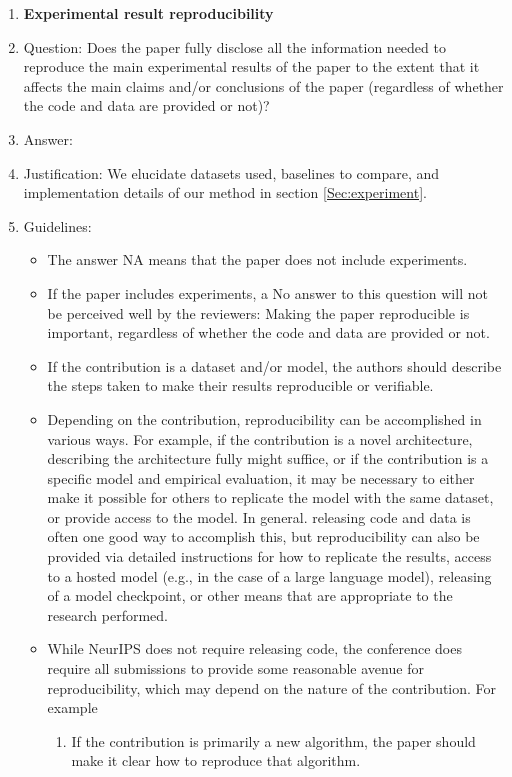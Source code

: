 \documentclass{article}
\begin{document}
\begin{enumerate}
    \item {\bf Experimental result reproducibility}
    \item[] Question: Does the paper fully disclose all the information needed to reproduce the main experimental results of the paper to the extent that it affects the main claims and/or conclusions of the paper (regardless of whether the code and data are provided or not)?
    \item[] Answer: \answerYes{} %
    \item[] Justification: We elucidate datasets used, baselines to compare, and implementation details of our method in section \ref{Sec:experiment}.
    \item[] Guidelines:
    \begin{itemize}
        \item The answer NA means that the paper does not include experiments.
        \item If the paper includes experiments, a No answer to this question will not be perceived well by the reviewers: Making the paper reproducible is important, regardless of whether the code and data are provided or not.
        \item If the contribution is a dataset and/or model, the authors should describe the steps taken to make their results reproducible or verifiable. 
        \item Depending on the contribution, reproducibility can be accomplished in various ways. For example, if the contribution is a novel architecture, describing the architecture fully might suffice, or if the contribution is a specific model and empirical evaluation, it may be necessary to either make it possible for others to replicate the model with the same dataset, or provide access to the model. In general. releasing code and data is often one good way to accomplish this, but reproducibility can also be provided via detailed instructions for how to replicate the results, access to a hosted model (e.g., in the case of a large language model), releasing of a model checkpoint, or other means that are appropriate to the research performed.
        \item While NeurIPS does not require releasing code, the conference does require all submissions to provide some reasonable avenue for reproducibility, which may depend on the nature of the contribution. For example
        \begin{enumerate}
            \item If the contribution is primarily a new algorithm, the paper should make it clear how to reproduce that algorithm.

\end{enumerate}
\end{itemize}
\end{enumerate}
\end{document}
